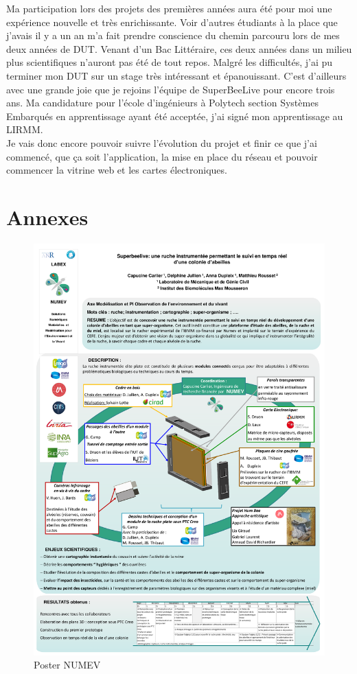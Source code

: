 \documentclass[11pt,french,a4paper]{report}
\begin{document}
Ma participation lors des projets des premières années aura été pour moi une expérience nouvelle et très enrichissante. Voir
d'autres étudiants à la place que j'avais il y a un an m'a fait prendre conscience du chemin parcouru lors de mes deux années de DUT. 
Venant d'un Bac Littéraire, ces deux années dans un milieu plus scientifiques n'auront pas été de tout repos. Malgré les difficultés, 
j'ai pu terminer mon DUT sur un stage très intéressant et épanouissant.
C'est d'ailleurs avec une grande joie que je rejoins l'équipe de SuperBeeLive pour encore trois ans. Ma candidature pour l'école d'ingénieurs
à Polytech section Systèmes Embarqués en apprentissage ayant été acceptée, j'ai signé mon apprentissage au LIRMM. \\
Je vais donc encore pouvoir suivre l'évolution du projet et finir ce que j'ai commencé, que ça soit l'application, la mise en place du 
réseau et pouvoir commencer la vitrine web et les cartes électroniques.  \\




\chapter{Annexes}
\begin{figure}[t]
    \centering
    \includegraphics[scale=0.2]{../images/annexes/poster_numev.pdf}
    \caption{Poster NUMEV}
    \label{an1}
\end{figure}
\end{document}
